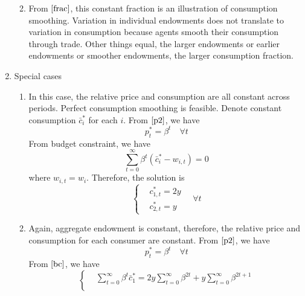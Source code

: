 \documentclass{article}
\begin{document}
\begin{enumerate}
\begin{enumerate}
\begin{enumerate}
            \end{enumerate}
            \item From \(\eqref{frac}\), this constant fraction is an illustration of consumption smoothing. Variation in individual endowments does not translate to variation in consumption because agents smooth their consumption through trade.
            Other things equal, the larger endowments or earlier endowments or smoother endowments, the larger consumption fraction.
        \end{enumerate}
        \item Special cases
        \begin{enumerate}
            \item In this case, the relative price and consumption are all constant across periods. Perfect consumption smoothing is feasible. 
            Denote constant consumption $\bar{c}_i^\ast$ for each $i$. From $\eqref{p2}$, we have
            \begin{equation*}
                p_t^\ast=\beta^t\quad\forall t
            \end{equation*}
            From budget constraint, we have
            \begin{equation}
                \sum_{t=0}^\infty\beta^t(\bar{c}_i^\ast-w_{i,t})=0\label{bc}
            \end{equation}
            where $w_{i,t}=w_i$. Therefore, the solution is
            \begin{equation*}
                \left\{\begin{aligned}
                    &c_{1,t}^\ast=2y\\
                    &c_{2,t}^\ast=y
                \end{aligned}\right.
                \quad\forall t
            \end{equation*}
            \item Again, aggregate endowment is constant, therefore, the relative price and consumption for each consumer are constant. From \(\eqref{p2}\), we have
            \begin{equation*}
                p_t^\ast=\beta^t\quad\forall t
            \end{equation*}
            From $\eqref{bc}$, we have
            \begin{equation*}
                \left\{\begin{aligned}
                    &\sum_{t=0}^\infty\beta^t\bar{c}_1^\ast=2y\sum_{t=0}^\infty\beta^{2t}+y\sum_{t=0}^\infty\beta^{2t+1}\\

\end{aligned}
\end{equation*}
\end{enumerate}
\end{enumerate}
\end{document}
